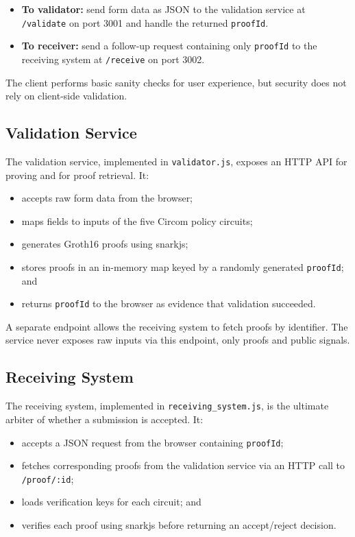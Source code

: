 \begin{itemize}[leftmargin=*]
  \item \textbf{To validator:} send form data as JSON to the validation service
    at \texttt{/validate} on port 3001 and handle the returned
    \texttt{proofId}.
  \item \textbf{To receiver:} send a follow-up request containing only
    \texttt{proofId} to the receiving system at \texttt{/receive} on port 3002.
\end{itemize}

The client performs basic sanity checks for user experience, but security does
not rely on client-side validation.

\subsection{Validation Service}

The validation service, implemented in \texttt{validator.js}, exposes an HTTP
API for proving and for proof retrieval. It:

\begin{itemize}[leftmargin=*]
  \item accepts raw form data from the browser;
  \item maps fields to inputs of the five Circom policy circuits;
  \item generates Groth16 proofs using snarkjs;
  \item stores proofs in an in-memory map keyed by a randomly generated
        \texttt{proofId}; and
  \item returns \texttt{proofId} to the browser as evidence that validation
        succeeded.
\end{itemize}

A separate endpoint allows the receiving system to fetch proofs by identifier.
The service never exposes raw inputs via this endpoint, only proofs and public
signals.

\subsection{Receiving System}

The receiving system, implemented in \texttt{receiving\_system.js}, is the
ultimate arbiter of whether a submission is accepted. It:

\begin{itemize}[leftmargin=*]
  \item accepts a JSON request from the browser containing \texttt{proofId};
  \item fetches corresponding proofs from the validation service via an HTTP
        call to \texttt{/proof/:id};
  \item loads verification keys for each circuit; and
  \item verifies each proof using snarkjs before returning an accept/reject
        decision.
\end{itemize}

